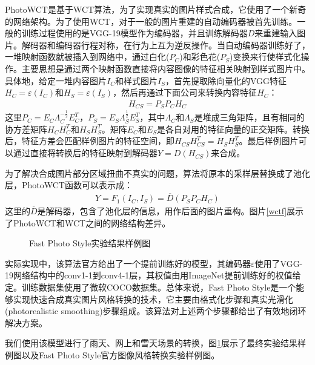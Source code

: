 PhotoWCT是基于WCT\cite{wctp}算法，为了实现真实的图片样式合成，它使用了一个新奇的网络架构。为了使用WCT，对于一般的图片重建的自动编码器被首先训练。一般的训练过程使用的是VGG-19模型作为编码器\varepsilon，并且训练解码器$D$来重建输入图片。解码器和编码器行程对称，在行为上互为逆反操作。当自动编码器训练好了，一堆映射函数就被插入到网络中，通过白化($P_C$)和彩色花($P_S$)变换来行使样式化操作。主要思想是通过两个映射函数直接将内容图像的特征相关映射到样式图片中。具体地，给定一堆内容图片$I_C$和样式图片$I_S$，首先提取除向量化的VGG特征$H_C=\varepsilon(I_C)$和$H_S=\varepsilon(I_S)$，然后再通过下面公司来转换内容特征$H_C$：
\begin{align}
    H_{CS}=P_SP_CH_C
\end{align}
这里$P_C=E_C\Lambda_C^{-\frac{1}{2}}E_C^T$，$P_S=E_S\Lambda_S^{\frac{1}{2}}E_S^T$，其中$\Lambda_C$和$\Lambda_S$是堆成三角矩阵，且有相同的协方差矩阵$H_CH_C^T$和$H_SH_S^T$。矩阵$E_C$和$E_S$是各自对用的特征向量的正交矩阵。转换后，特征方差会匹配样例图片的特征空间，即$H_{CS}H_{CS}^T=H_SH_S^T$。最后样例图片可以通过直接将转换后的特征映射到解码器$Y=D(H_{CS})$来合成。

为了解决合成图片部分区域扭曲不真实的问题，算法将原本的采样层替换成了池化层，PhotoWCT函数可以表示成：
\begin{align}
    Y=F_1(I_C,I_S)=\overline{D}(P_SP_CH_C)
\end{align}
这里的$\overline{D}$是解码器，包含了池化层的信息，用作后面的图片重构。图片\ref{wctf}展示了PhotoWCT和WCT之间的网络结构差异。

\begin{figure}[t]
    \centering
    \caption{Fast Photo Style实验结果样例图}
    \label{fps-result}
\end{figure}

实际实现中，该算法官方给出了一个提前训练好的模型，其编码器$\varepsilon$使用了VGG-19网络结构中的conv1-1到conv4-1层，其权值由用ImageNet提前训练好的权值给定。训练数据集使用了微软COCO数据集\cite{coco}。总体来说，Fast Photo Style是一个能够实现快速合成真实图片风格转换的技术，它主要由格式化步骤和真实光滑化(photorealistic smoothing)步骤组成。该算法对上述两个步骤都给出了有效地闭环解决方案。

我们使用该模型进行了雨天、网上和雪天场景的转换，图\ref{fps-result}展示了最终实验结果样例图以及Fast Photo Style官方图像风格转换实验样例图。

